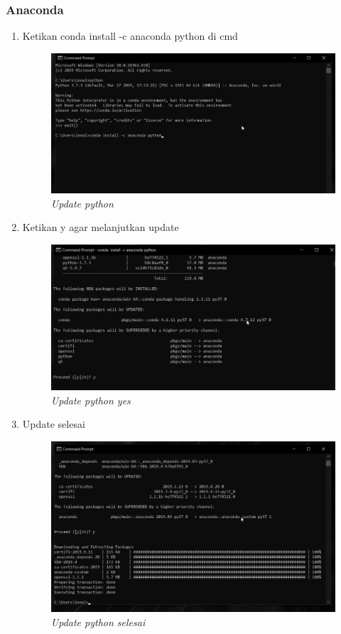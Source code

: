 \subsubsection{Anaconda} 
\begin{enumerate}
\item Ketikan conda install -c anaconda python di cmd
\begin{figure}[H]
    \centering
    \includegraphics[scale=0.4]{figures/updatepython}
    \caption{\textit{Update python}}
    \label{Update Python}
\end{figure}
\item Ketikan y agar melanjutkan update
\begin{figure}[H]
    \centering
    \includegraphics[scale=0.4]{figures/updatepythonyes}
    \caption{\textit{Update python yes}}
    \label{Update Python yes}
\end{figure}
\item Update selesai
\begin{figure}[H]
    \centering
    \includegraphics[scale=0.4]{figures/updatepythonselesai}
    \caption{\textit{Update python selesai}}
    \label{Update Python selesai}
\end{figure}
\end{enumerate}

